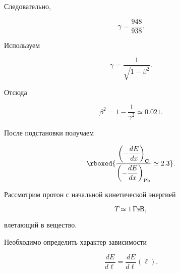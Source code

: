 \documentclass[../final.tex]{subfiles}
\begin{document}
Следовательно,

\begin{equation*}
    \gamma
    =
    \frac{948}{938}.
\end{equation*}

Используем

\begin{equation*}
    \gamma
    =
    \frac{1}{
        \sqrt{
            1-\beta^2
        }
    }.
\end{equation*}

Отсюда

\begin{equation*}
    \beta^2
    =
    1-
    \frac{1}{\gamma^2}
    \simeq
    0.021.
\end{equation*}

После подстановки получаем

\begin{equation*}
    \rboxed{
        \frac{
            \left(
                -\dfrac{dE}{dx}
            \right)_{\mathrm C}
        }{
            \left(
                -\dfrac{dE}{dx}
            \right)_{\mathrm{Pb}}
        }
        \simeq
        2.3
    }.
\end{equation*}



\condition

Рассмотрим протон с начальной кинетической энергией

\begin{equation*}
    T
    \simeq
    1\,\text{ГэВ},
\end{equation*}

влетающий в вещество.

Необходимо определить характер зависимости

\begin{equation*}
    \frac{dE}{d\ell}
    =
    \frac{dE}{d\ell}(\ell).
\end{equation*}
\end{document}
